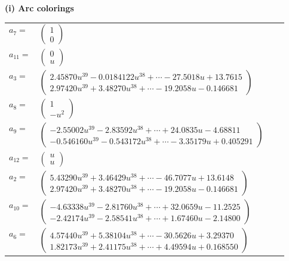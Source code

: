 \documentclass[1p]{elsarticle_modified}
\theoremstyle{definition}
\begin{document}
\flushleft \textbf{(i) Arc colorings}\\
\begin{tabular}{m{7pt} m{180pt} m{7pt} m{180pt} }
\flushright $a_{7}=$&$\begin{pmatrix}1\\0\end{pmatrix}$ \\
\flushright $a_{11}=$&$\begin{pmatrix}0\\u\end{pmatrix}$ \\
\flushright $a_{3}=$&$\begin{pmatrix}2.45870 u^{39}-0.0184122 u^{38}+\cdots-27.5018 u+13.7615\\2.97420 u^{39}+3.48270 u^{38}+\cdots-19.2058 u-0.146681\end{pmatrix}$ \\
\flushright $a_{8}=$&$\begin{pmatrix}1\\- u^2\end{pmatrix}$ \\
\flushright $a_{9}=$&$\begin{pmatrix}-2.55002 u^{39}-2.83592 u^{38}+\cdots+24.0835 u-4.68811\\-0.546160 u^{39}-0.543172 u^{38}+\cdots-3.35179 u+0.405291\end{pmatrix}$ \\
\flushright $a_{12}=$&$\begin{pmatrix}u\\u\end{pmatrix}$ \\
\flushright $a_{2}=$&$\begin{pmatrix}5.43290 u^{39}+3.46429 u^{38}+\cdots-46.7077 u+13.6148\\2.97420 u^{39}+3.48270 u^{38}+\cdots-19.2058 u-0.146681\end{pmatrix}$ \\
\flushright $a_{10}=$&$\begin{pmatrix}-4.63338 u^{39}-2.81760 u^{38}+\cdots+32.0659 u-11.2525\\-2.42174 u^{39}-2.58541 u^{38}+\cdots+1.67460 u-2.14800\end{pmatrix}$ \\
\flushright $a_{6}=$&$\begin{pmatrix}4.57440 u^{39}+5.38104 u^{38}+\cdots-30.5626 u+3.29370\\1.82173 u^{39}+2.41175 u^{38}+\cdots+4.49594 u+0.168550\end{pmatrix}$ \\

\end{tabular}
\end{document}
